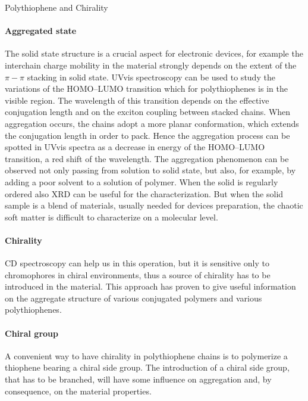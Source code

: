 \begin{section}{Polythiophene and Chirality}
\paragraph{Aggregated state} The solid state structure is a crucial aspect for electronic devices, for example the interchain charge mobility in the material strongly depends on the extent of the $\pi-\pi$ stacking in solid state. \Gls{UVvis} spectroscopy can be used to study the variations of the \acrshort{HOMO}--\acrshort{LUMO} transition which for polythiophenes is in the visible region. The wavelength of this transition depends on the effective conjugation length and on the exciton coupling between stacked chains. 
When aggregation occurs, the chains adopt a more planar conformation, which extends the conjugation length in order to pack. Hence the aggregation process can be spotted in \gls{UVvis} spectra as a decrease in energy of the \acrshort{HOMO}--\acrshort{LUMO} transition, a red shift of the wavelength. 
The aggregation phenomenon can be observed not only passing from solution to solid state, but also, for example, by adding a poor solvent to a solution of polymer. When the solid is regularly ordered also \acrfull{XRD} can be useful for the characterization. But when the solid sample 
is a blend of materials, usually needed for devices preparation, the chaotic soft matter is difficult to characterize on a molecular level. 

\paragraph{Chirality} \label{intro-cd}\Gls{CD} spectroscopy can help us in this operation, but it is sensitive only to chromophores in chiral environments, thus a source of chirality has to be introduced in the material. This approach has proven to give useful information on the aggregate structure of various conjugated polymers and various polythiophenes. 

\paragraph{Chiral group} A convenient way to have chirality in polythiophene chains is to polymerize a thiophene bearing a chiral side group. The introduction of a chiral side group, that has to be branched, will have some influence on aggregation and, by consequence, on the material properties.

\end{section}
